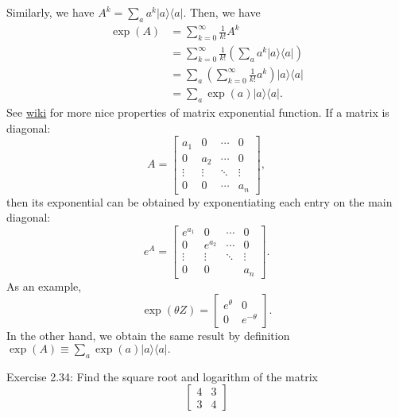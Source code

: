 Similarly, we have $A^k=\sum_{a} a^k|a\rangle\langle a|$. Then, we have
\begin{align}
\exp (A) 
&=\sum_{k=0}^{\infty} \frac{1}{k!} A^k \\
&=\sum_{k=0}^{\infty} \frac{1}{k!}  \left(\sum_{a} a^k|a\rangle\langle a|\right)\\
&=\sum_{a} \left( \sum_{k=0}^{\infty} \frac{1}{k!}  a^k \right)|a\rangle\langle a|\\
&=\sum_{a} \exp (a)|a\rangle\langle a|.
\end{align}
See \href{https://en.wikipedia.org/wiki/Matrix_exponential}{wiki} for more nice properties of matrix exponential function. If a matrix is diagonal:
\begin{equation}
    A=\left[\begin{array}{cccc}
a_1 & 0 & \cdots & 0 \\
0 & a_2 & \cdots & 0 \\
\vdots & \vdots & \ddots & \vdots \\
0 & 0 & \cdots & a_n
\end{array}\right],
\end{equation}
then its exponential can be obtained by exponentiating each entry on the main diagonal:
\begin{equation}
    e^A=\left[\begin{array}{cccc}
e^{a_1} & 0 & \cdots & 0 \\
0 & e^{a_2} & \cdots & 0 \\
\vdots & \vdots & \ddots & \vdots \\
0 & 0 & & a_n
\end{array}\right] .
\end{equation}
As an example,
\begin{equation}
    \exp (\theta Z)=\left[\begin{array}{cc}
e^{\theta} & 0 \\
0 & e^{-\theta}
\end{array}\right].
\end{equation}
In the other hand, we obtain the same result by definition $\exp (A) \equiv \sum_{a} \exp (a)|a\rangle\langle a|.$

\begin{exercise}
Exercise 2.34: Find the square root and logarithm of the matrix
\begin{equation}
    \left[\begin{array}{ll}
4 & 3 \\
3 & 4
\end{array}\right]
\end{equation}
\end{exercise}


